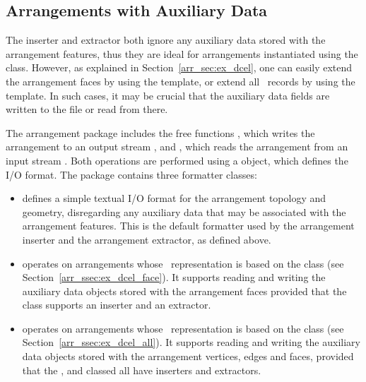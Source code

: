 \begin{ccAdvanced}
\subsection{Arrangements with Auxiliary Data}
\label{arr_ssec:arr_io_aux_data}
%
The inserter and extractor both ignore any auxiliary data stored with
the arrangement features, thus they are ideal for arrangements
instantiated using the  class.
However, as explained in Section~\ref{arr_sec:ex_dcel}, one can easily
extend the arrangement faces by using the 
template, or extend all \dcel\ records by using the 
template. In such cases, it may be crucial that the auxiliary data fields
are written to the file or read from there.

The arrangement package includes the free functions
, which writes the arrangement 
to an output stream , and , which
reads the arrangement  from an input stream . Both
operations are performed using a  object, which defines
the I/O format. The package contains three formatter classes:
\begin{itemize}
\item {} defines a simple textual
I/O format for the arrangement topology and geometry, disregarding any
auxiliary data that may be associated with the arrangement features.
This is the default formatter used by the arrangement inserter and the
arrangement extractor, as defined above.
%
\item {} operates on
arrangements whose \dcel\ representation is based on the
 class (see
Section~\ref{arr_ssec:ex_dcel_face}). It supports reading and writing
the auxiliary data objects stored with the arrangement faces provided
that the  class supports an inserter and an extractor.
%
\item {} operates on
arrangements whose \dcel\ representation is based on the
 class
(see Section~\ref{arr_ssec:ex_dcel_all}). It supports reading and writing
the auxiliary data objects stored with the arrangement vertices, edges
and faces, provided that the ,  and
 classed all have inserters and extractors.
\end{itemize}


\end{ccAdvanced}
